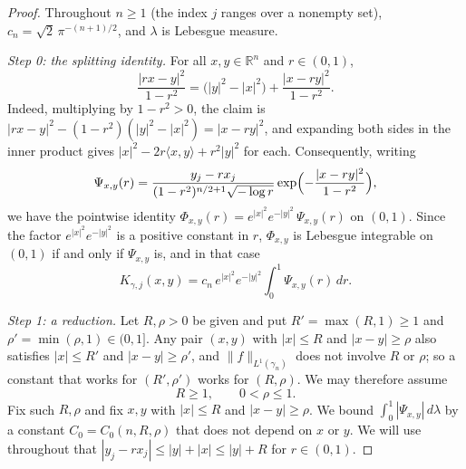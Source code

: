 \begin{proof}
Throughout $n \geq 1$ (the index $j$ ranges over a nonempty set),
$c_n = \sqrt2\,\pi^{-(n+1)/2}$, and $\lambda$ is Lebesgue measure.

\emph{Step 0: the splitting identity.}
For all $x,y \in \mathbb{R}^n$ and $r \in (0,1)$,
\begin{equation*}
  \frac{|rx-y|^2}{1-r^2} = \bigl(|y|^2-|x|^2\bigr) + \frac{|x-ry|^2}{1-r^2} .
  \tag{1}
\end{equation*}
Indeed, multiplying by $1-r^2 > 0$, the claim is
$|rx-y|^2 - (1-r^2)(|y|^2-|x|^2) = |x-ry|^2$, and expanding both sides in the
inner product gives $|x|^2 - 2r\langle x,y\rangle + r^2|y|^2$ for each.
Consequently, writing
\[
  \Psi_{x,y}(r)
    = \frac{y_j-rx_j}{(1-r^2)^{n/2+1}\sqrt{-\log r}}
      \exp\Bigl(-\frac{|x-ry|^2}{1-r^2}\Bigr) ,
\]
we have the pointwise identity
$\Phi_{x,y}(r) = e^{|x|^2}e^{-|y|^2}\,\Psi_{x,y}(r)$ on $(0,1)$.  Since the
factor $e^{|x|^2}e^{-|y|^2}$ is a positive constant in $r$, $\Phi_{x,y}$ is
Lebesgue integrable on $(0,1)$ if and only if $\Psi_{x,y}$ is, and in that case
\begin{equation*}
  K_{\gamma,j}(x,y)
    = c_n\,e^{|x|^2}e^{-|y|^2}\int_0^1\Psi_{x,y}(r)\,dr . \tag{2}
\end{equation*}

\emph{Step 1: a reduction.}
Let $R,\rho > 0$ be given and put $R' = \max(R,1) \geq 1$ and
$\rho' = \min(\rho,1) \in (0,1]$.  Any pair $(x,y)$ with $|x| \leq R$ and
$|x-y| \geq \rho$ also satisfies $|x| \leq R'$ and $|x-y| \geq \rho'$, and
$\|f\|_{L^1(\gamma_n)}$ does not involve $R$ or $\rho$; so a constant that works
for $(R',\rho')$ works for $(R,\rho)$.  We may therefore assume
\[
  R \geq 1, \qquad 0 < \rho \leq 1 .
\]
Fix such $R,\rho$ and fix $x,y$ with $|x| \leq R$ and $|x-y| \geq \rho$.  We
bound $\int_0^1|\Psi_{x,y}|\,d\lambda$ by a constant $C_0 = C_0(n,R,\rho)$ that
does not depend on $x$ or $y$.  We will use throughout that
$|y_j - rx_j| \leq |y| + |x| \leq |y| + R$ for $r \in (0,1)$.


\end{proof}
